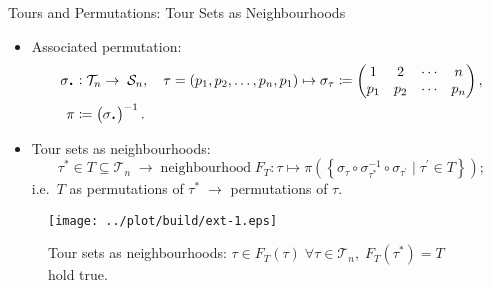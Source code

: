 \documentclass[
  size=8pt,
  style=klope,
  paper=screen,
  mode=present,
  nohandoutpagebreaks,
  pauseslide,
  hlsections,
  fleqn,
]{powerdot}
\newcommand*{\Cdot}{\raisebox{-0.30ex}{\scalebox{1.5}{$\cdot$}}}
\def\eqitspace{\vspace{-5mm}}
\begin{document}
\begin{slide}[toc=Tour Sets as Neighbourhoods]{Tours and Permutations: Tour Sets as Neighbourhoods}
  \begin{itemize}
  \item
  Associated permutation:
  \begin{align}
  \begin{split}
    \sigma_{\Cdot} & :
    \mathcal{T}_n \to \; \mathcal{S}_n, \quad
    \tau = \left(p_1, p_2, \ldots, p_n, p_1 \right)
    \mapsto
  \sigma_\tau \coloneqq
  \begin{pmatrix}
    1 & 2 & \cdots & n \\
    p_1 & p_2 & \cdots &  p_n
  \end{pmatrix},
  \\
  \pi & \coloneqq \left(\sigma_{\Cdot}\right)^{-1}.
  \end{split}
  \end{align}
  \eqitspace%
  \item
    Tour sets as neighbourhoods:
    \begin{equation}
      \tau^\ast \in T \subseteq \mathcal{T}_n
      \; \rightarrow \;
      \text{neighbourhood} \;
      F_T : \tau \mapsto
      \pi \left(
        \left\{ \sigma_{\tau} \circ \sigma_{\tau^\ast}^{-1} \circ \sigma_{\tau^\prime} \mid \tau^{\prime} \in T\right\}
      \right);
    \end{equation}
    i.e.\ $T$ as permutations of $\tau^\ast \; \rightarrow $ permutations of $\tau$.
  \end{itemize}
  \vspace{-2mm}
  \begin{figure}[H]
    \centering
    \texttt{[image: ../plot/build/ext-1.eps]}
    \caption{%
      Tour sets as neighbourhoods:
      $\tau \in F_T\left(\tau\right) \; \forall \tau \in \mathcal{T}_n, \; F_T\left(\tau^\ast\right) = T$ hold true.
    }
  \end{figure}
\end{slide}
\end{document}
